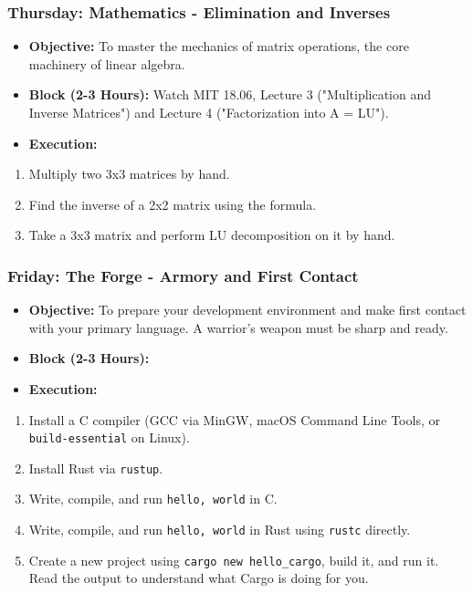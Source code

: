 \subsubsection{\textbf{Thursday: Mathematics - Elimination and Inverses}}
\begin{itemize}
  \item \textbf{Objective:} To master the mechanics of matrix operations, the core machinery of linear algebra.
  \item \textbf{Block (2-3 Hours):} Watch MIT 18.06, Lecture 3 ("Multiplication and Inverse Matrices") and Lecture 4 ("Factorization into A = LU").
  \item \textbf{Execution:}
\end{itemize}
\begin{enumerate}
  \item Multiply two 3x3 matrices by hand.
  \item Find the inverse of a 2x2 matrix using the formula.
  \item Take a 3x3 matrix and perform LU decomposition on it by hand.

\end{enumerate}
\subsubsection{\textbf{Friday: The Forge - Armory and First Contact}}
\begin{itemize}
  \item \textbf{Objective:} To prepare your development environment and make first contact with your primary language. A warrior's weapon must be sharp and ready.
  \item \textbf{Block (2-3 Hours):}
  \item \textbf{Execution:}
\end{itemize}
\begin{enumerate}
  \item Install a C compiler (GCC via MinGW, macOS Command Line Tools, or \texttt{build-essential} on Linux).
  \item Install Rust via \texttt{rustup}.
  \item Write, compile, and run \texttt{hello, world} in C.
  \item Write, compile, and run \texttt{hello, world} in Rust using \texttt{rustc} directly.
  \item Create a new project using \texttt{cargo new hello\_cargo}, build it, and run it. Read the output to understand what Cargo is doing for you.

\end{enumerate}
